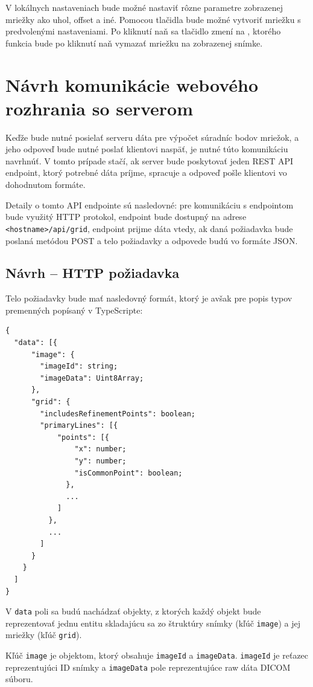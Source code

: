 V lokálnych nastaveniach bude možné nastaviť rôzne parametre zobrazenej mriežky ako uhol, offset a iné. Pomocou tlačidla  bude možné vytvoriť mriežku s predvolenými nastaveniami. Po kliknutí naň sa tlačidlo zmení na , ktorého funkcia bude po kliknutí naň vymazať mriežku na zobrazenej snímke. \clearpage

\section {Návrh komunikácie webového rozhrania so serverom}\label{api_endpoint}
Keďže bude nutné posielať serveru dáta pre výpočet súradníc bodov mriežok, a jeho odpoveď bude nutné poslať klientovi naspäť, je nutné túto komunikáciu navrhnúť. V tomto prípade stačí, ak server bude poskytovať jeden REST API endpoint, ktorý potrebné dáta príjme, spracuje a odpoveď pošle klientovi vo dohodnutom formáte.

Detaily o tomto API endpointe sú nasledovné: pre komunikáciu s endpointom bude využitý HTTP protokol, endpoint bude dostupný na adrese \texttt{<hostname>/api/grid}, endpoint prijme dáta vtedy, ak daná požiadavka bude poslaná metódou POST a telo požiadavky a odpovede budú vo formáte JSON.

\subsection {Návrh -- HTTP požiadavka}

Telo požiadavky bude mať nasledovný formát, ktorý je avšak pre popis typov premenných popísaný v TypeScripte:
\begin{verbatim}
{
  "data": [{
      "image": {
        "imageId": string;
        "imageData": Uint8Array;
      },
      "grid": {
        "includesRefinementPoints": boolean;
        "primaryLines": [{
            "points": [{
                "x": number;
                "y": number;
                "isCommonPoint": boolean;
              },
              ...
            ]
          },
          ...
        ]
      }
    }
  ]
}
\end{verbatim}

V \texttt{data} poli sa budú nachádzať objekty, z ktorých každý objekt bude reprezentovať jednu entitu skladajúcu sa zo štruktúry snímky (kľúč \texttt{image}) a jej mriežky (kľúč \texttt{grid}).

Kľúč \texttt{image} je objektom, ktorý obsahuje \texttt{imageId} a \texttt{imageData}. \texttt{imageId} je reťazec reprezentujúci ID snímky a \texttt{imageData} pole reprezentujúce raw dáta DICOM súboru.

